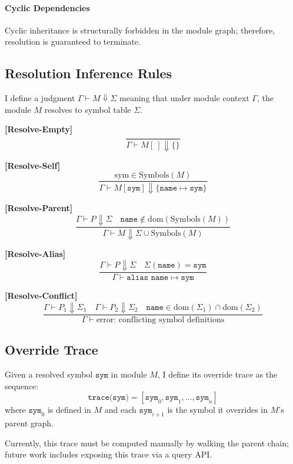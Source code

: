 \documentclass[sigplan,screen]{acmart}
\begin{document}
\paragraph{Cyclic Dependencies}
Cyclic inheritance is structurally forbidden in the module graph; therefore, resolution is guaranteed to terminate.

\subsection{Resolution Inference Rules}

I define a judgment $\Gamma \vdash M \Downarrow \Sigma$ meaning that under module context $\Gamma$, the module $M$ resolves to symbol table $\Sigma$.

\textbf{[Resolve-Empty]}
\[
\frac{~}{\Gamma \vdash M[\ ] \Downarrow \{\}}
\]

\textbf{[Resolve-Self]}
\[
\frac{\text{sym} \in \text{Symbols}(M)}{\Gamma \vdash M[\texttt{sym}] \Downarrow \{\texttt{name} \mapsto \texttt{sym}\}}
\]

\textbf{[Resolve-Parent]}
\[
\frac{
  \Gamma \vdash P \Downarrow \Sigma \quad 
  \texttt{name} \notin \text{dom}(\text{Symbols}(M))
}{
  \Gamma \vdash M \Downarrow \Sigma \cup \text{Symbols}(M)
}
\]

\textbf{[Resolve-Alias]}
\[
\frac{
  \Gamma \vdash P \Downarrow \Sigma \quad 
  \Sigma(\texttt{name}) = \texttt{sym}
}{
  \Gamma \vdash \texttt{alias name} \mapsto \texttt{sym}
}
\]

\textbf{[Resolve-Conflict]}
\[
\frac{
  \Gamma \vdash P_1 \Downarrow \Sigma_1 \quad
  \Gamma \vdash P_2 \Downarrow \Sigma_2 \quad
  \texttt{name} \in \text{dom}(\Sigma_1) \cap \text{dom}(\Sigma_2)
}{
  \Gamma \vdash \text{error: conflicting symbol definitions}
}
\]

\subsection{Override Trace}

Given a resolved symbol $\texttt{sym}$ in module $M$, I define its override trace as the sequence:
\[
\texttt{trace(sym)} = [\texttt{sym}_0, \texttt{sym}_1, \dots, \texttt{sym}_n]
\]
where $\texttt{sym}_0$ is defined in $M$ and each $\texttt{sym}_{i+1}$ is the symbol it overrides in $M$'s parent graph.

Currently, this trace must be computed manually by walking the parent chain; future work includes exposing this trace via a query API.
\end{document}
